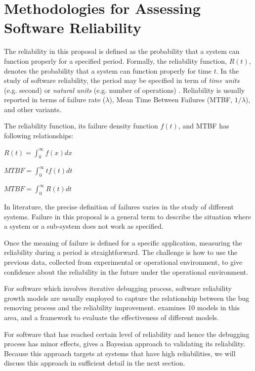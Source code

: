 \documentclass[12pt, authoryear]{article}
\begin{document}
\section{Methodologies for Assessing Software Reliability}\label{methodology}


The reliability in this proposal is defined as the probability that a system can
function properly for a specified period.  Formally, the reliability function, 
$R(t)$, denotes the probability that a system can function properly for time 
$t$.  In the study of software reliability, the period may be specified in term 
of {\it time units} (e.g. second) or {\it natural units} (e.g. number of 
operations) \citep{MusaBook}.  Reliability is usually reported in terms of  
failure rate ($\lambda$), Mean Time Between Failures (MTBF, $1/\lambda$), and 
other variants.  

The reliability function, its failure density function $f(t)$, and MTBF has 
following relationships: \citep{MusaBook}

$R(t) = \int_{0}^{\infty}f(x) dx$

$MTBF = \int_{0}^{\infty} tf(t)dt$

$MTBF = \int_{0}^{\infty} R(t)dt$


In literature, the precise definition of failures varies in the study of 
different systems.  Failure in this proposal is a general term to describe the 
situation where a system or a sub-system does not work as specified.

Once the meaning of failure is defined for a specific application, measuring 
the reliability during a period is straightforward.  The challenge 
is how to use the previous data, collected from experimental or operational 
environment, to give confidence about the reliability in the future under the
operational environment.

For software which involves iterative debugging process, software reliability 
growth models are usually employed to capture the relationship between the bug 
removing process and the reliability improvement.  \citep{Abdel-GhalyCL86} 
examines 10 models in this area, and a framework to evaluate the effectiveness 
of different models.

For software that has reached certain level of reliability and hence 
the debugging process has minor effects, \citep{Littlewood93} gives a 
Bayesian approach to validating its reliability.  Because this approach 
targets at systems that have high reliabilities, we will discuss this approach 
in sufficient detail in the next section.
\end{document}
